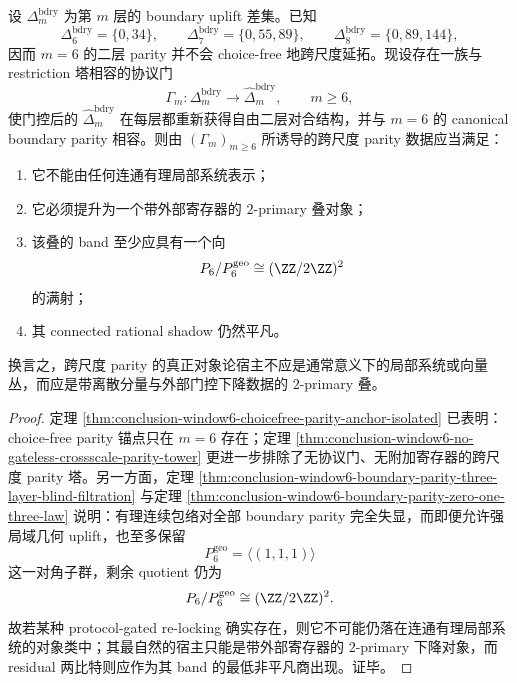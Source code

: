 \begin{conjecture}\label{conj:conclusion-window6-boundary-crossscale-parity-stack-principle}
设 \(\Delta_m^{\mathrm{bdry}}\) 为第 \(m\) 层的 boundary uplift 差集。已知
\[
\Delta_6^{\mathrm{bdry}}=\{0,34\},
\qquad
\Delta_7^{\mathrm{bdry}}=\{0,55,89\},
\qquad
\Delta_8^{\mathrm{bdry}}=\{0,89,144\},
\]
因而 \(m=6\) 的二层 parity 并不会 choice-free 地跨尺度延拓。现设存在一族与 restriction 塔相容的协议门
\[
\Gamma_m:\Delta_m^{\mathrm{bdry}}\longrightarrow \widehat{\Delta}_m^{\mathrm{bdry}},
\qquad m\ge 6,
\]
使门控后的 \(\widehat{\Delta}_m^{\mathrm{bdry}}\) 在每层都重新获得自由二层对合结构，并与 \(m=6\) 的 canonical boundary parity 相容。则由 \((\Gamma_m)_{m\ge 6}\) 所诱导的跨尺度 parity 数据应当满足：
\begin{enumerate}
  \item 它不能由任何连通有理局部系统表示；
  \item 它必须提升为一个带外部寄存器的 \(2\)-primary 叠对象；
  \item 该叠的 band 至少应具有一个向
  \[
  P_6/P_6^{\mathrm{geo}}\cong (\ZZ/2\ZZ)^2
  \]
  的满射；
  \item 其 connected rational shadow 仍然平凡。
\end{enumerate}
换言之，跨尺度 parity 的真正对象论宿主不应是通常意义下的局部系统或向量丛，而应是带离散分量与外部门控下降数据的 \(2\)-primary 叠。
\end{conjecture}
\begin{proof}
定理 \ref{thm:conclusion-window6-choicefree-parity-anchor-isolated} 已表明：choice-free parity 锚点只在 \(m=6\) 存在；定理 \ref{thm:conclusion-window6-no-gateless-crossscale-parity-tower} 更进一步排除了无协议门、无附加寄存器的跨尺度 parity 塔。另一方面，定理 \ref{thm:conclusion-window6-boundary-parity-three-layer-blind-filtration} 与定理 \ref{thm:conclusion-window6-boundary-parity-zero-one-three-law} 说明：有理连续包络对全部 boundary parity 完全失显，而即便允许强局域几何 uplift，也至多保留
\[
P_6^{\mathrm{geo}}=\langle(1,1,1)\rangle
\]
这一对角子群，剩余 quotient 仍为
\[
P_6/P_6^{\mathrm{geo}}\cong (\ZZ/2\ZZ)^2.
\]
故若某种 protocol-gated re-locking 确实存在，则它不可能仍落在连通有理局部系统的对象类中；其最自然的宿主只能是带外部寄存器的 \(2\)-primary 下降对象，而 residual 两比特则应作为其 band 的最低非平凡商出现。证毕。
\end{proof}

